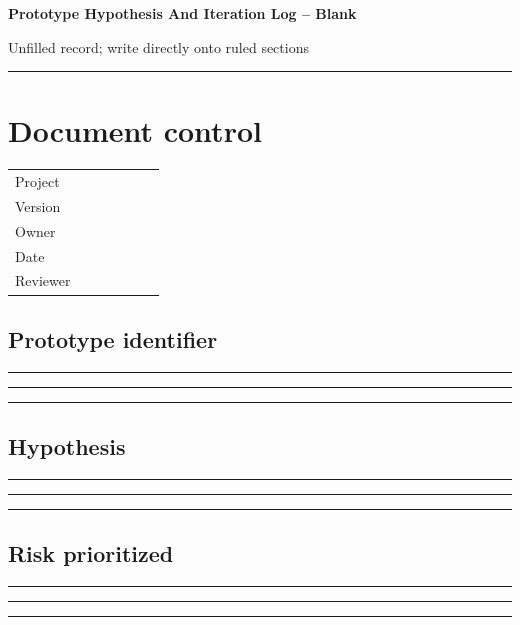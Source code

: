 \documentclass[11pt]{article}
\begin{document}
{\huge\bfseries\color{suiteblue} Prototype Hypothesis And Iteration Log -- Blank}\par
\vspace{0.15in}
{\normalsize\color{suitegray} Unfilled record; write directly onto ruled sections}\par
\vspace{0.15in}\hrule\vspace{0.15in}

\section{Document control}
\renewcommand{\arraystretch}{1.8}
\begin{tabularx}{\linewidth}{@{}p{0.30\linewidth}X@{}}\toprule
Project & \hrulefill\\ Version & \hrulefill\\ Owner & \hrulefill\\ Date & \hrulefill\\ Reviewer & \hrulefill\\ \bottomrule\end{tabularx}

\subsection{Prototype identifier}
\noindent\rule{\linewidth}{0.3pt}\par\vspace{0.18in}
\noindent\rule{\linewidth}{0.3pt}\par\vspace{0.18in}
\noindent\rule{\linewidth}{0.3pt}\par\vspace{0.14in}

\subsection{Hypothesis}
\noindent\rule{\linewidth}{0.3pt}\par\vspace{0.18in}
\noindent\rule{\linewidth}{0.3pt}\par\vspace{0.18in}
\noindent\rule{\linewidth}{0.3pt}\par\vspace{0.14in}

\subsection{Risk prioritized}
\noindent\rule{\linewidth}{0.3pt}\par\vspace{0.18in}
\noindent\rule{\linewidth}{0.3pt}\par\vspace{0.18in}
\noindent\rule{\linewidth}{0.3pt}\par\vspace{0.14in}
\end{document}
